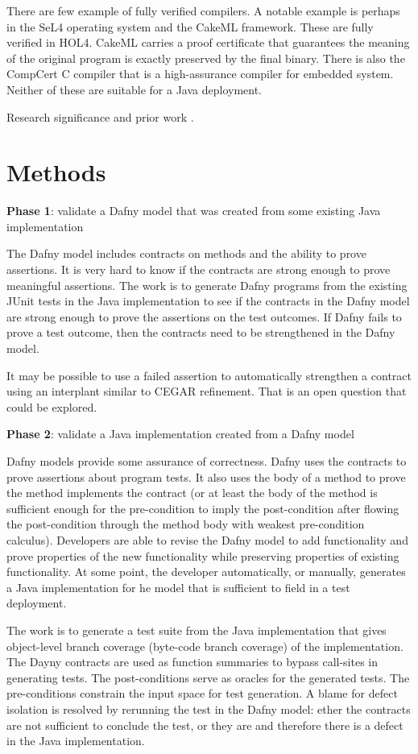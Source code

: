 \documentclass[11pt,onecolumn,notitlepage]{article}
\begin{document}
There are few example of fully verified compilers. A notable example is perhaps in the SeL4 operating system and the CakeML framework. These are fully verified in HOL4. CakeML carries a proof certificate that guarantees the meaning of the original program is exactly preserved by the final binary. There is also the CompCert C compiler that is a high-assurance compiler for embedded system. Neither of these are suitable for a Java deployment.

Research significance and prior work \cite{8972014}.

\section*{Methods}

\noindent\textbf{Phase 1}: validate a Dafny model that was created from some existing Java implementation

The Dafny model includes contracts on methods and the ability to prove assertions. It is very hard to know if the contracts are strong enough to prove meaningful assertions. The work is to generate Dafny programs from the existing JUnit tests in the Java implementation to see if the contracts in the Dafny model are strong enough to prove the assertions on the test outcomes. If Dafny fails to prove a test outcome, then the contracts need to be strengthened in the Dafny model. 

It may be possible to use a failed assertion to automatically strengthen a contract using an interplant similar to CEGAR refinement. That is an open question that could be explored.

\noindent\textbf{Phase 2}: validate a Java implementation created from a Dafny model

Dafny models provide some assurance of correctness. Dafny uses the contracts to prove assertions about program tests. It also uses the body of a method to prove the method implements the contract (or at least the body of the method is sufficient enough for the pre-condition to imply the post-condition after flowing the post-condition through the method body with weakest pre-condition calculus). Developers are able to revise the Dafny model to add functionality and prove properties of the new functionality while preserving properties of existing functionality. At some point, the developer automatically, or manually, generates a Java implementation for he model that is sufficient to field in a test deployment. 

The work is to generate a test suite from the Java implementation that gives object-level branch coverage (byte-code branch coverage) of the implementation. The Dayny contracts are used as function summaries to bypass call-sites in generating tests. The post-conditions serve as oracles for the generated tests. The pre-conditions constrain the input space for test generation. A blame for defect isolation is resolved by rerunning the test in the Dafny model: ether the contracts are not sufficient to conclude the test, or they are and therefore there is a defect in the Java implementation.
\end{document}
